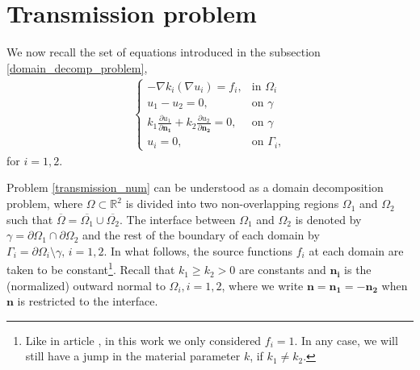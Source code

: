 

\section{Transmission problem}\label{numerical_transmission_simulations}

We now recall the set of equations introduced in the subsection \ref{domain_decomp_problem},
\begin{align}\label{transmission_num}
    \begin{cases}
    - \nabla k_i \left(\nabla u_i\right) = f_i, & \text{in }\Omega_i\\
    u_1 - u_2 = 0, & \text{on }\gamma\\
    k_1 \frac{\partial u_1}{\partial \mathbf{n_1}} + k_2 \frac{\partial u_2}{\partial  \mathbf{n_2}} = 0, & \text{on }\gamma\\
    u_i = 0, & \text{on }\Gamma_i,
    \end{cases}
\end{align}
for \(i=1, 2\).

Problem \ref{transmission_num} can be understood as a domain decomposition problem, where \(\Omega \subset \mathbb{R}^2\) is divided into two non-overlapping regions \(\Omega_1\) and \(\Omega_2\) such that \(\overline{\Omega} = \overline{\Omega_1} \cup \overline{\Omega_2}\). The interface between \(\Omega_1\) and \(\Omega_2\) is denoted by \(\gamma = \partial\Omega_1 \cap \partial\Omega_2\) and the rest of the boundary of each domain by \(\Gamma_i = \partial\Omega_i\setminus{\gamma}, \, i=1, 2\). In what follows, the source functions \(f_i\) at each domain are taken to be constant\footnote{Like in article \cite{gustafsson2019error}, in this work we only considered \(f_i=1\). In any case, we will still have a jump in the material parameter \(k\), if \(k_1 \neq k_2\).
}. Recall that \(k_1 \geq k_2 > 0\) are constants and \(\mathbf{n_i}\) is the (normalized) outward normal to \(\Omega_i, i=1, 2\), where we write \(\mathbf{n}= \mathbf{n_1}=- \mathbf{n_2}\) when \(\mathbf{n}\) is restricted to the interface.

